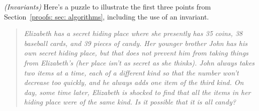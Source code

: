 



\exercise\label{proofs: prob: elizabeth hides from john}\emph{(Invariants)}
Here's a puzzle to illustrate the first three points from Section~\ref{proofs: sec: algorithms},
including the use of an invariant.

\begin{quote}\em
  Elizabeth has a secret hiding place where she presently has 35 coins, 38 baseball cards, and 39 pieces of candy. Her younger brother John has his own secret hiding place, but that does not prevent him from taking things from Elizabeth's (her place isn't as secret as she thinks). John always takes two items at a time, each of a different kind so that the number won't decrease too quickly, and he always adds one item of the third kind. On day, some time later, Elizabeth is shocked to find that all the items in her hiding place were of the same kind. Is it possible that it is all candy?
\end{quote}

